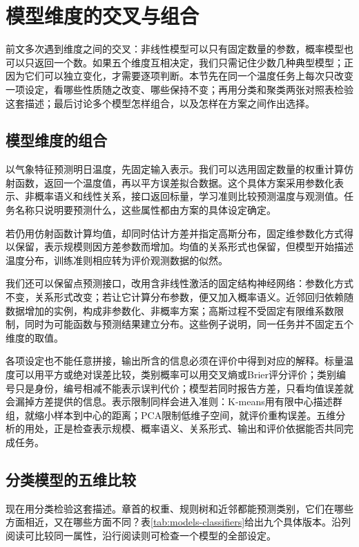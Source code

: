 \FloatBarrier
\section{模型维度的交叉与组合}
\label{sec:models-crossing}

前文多次遇到维度之间的交叉：非线性模型可以只有固定数量的参数，概率模型也可以只返回一个数。如果五个维度互相决定，我们只需记住少数几种典型模型；正因为它们可以独立变化，才需要逐项判断。本节先在同一个温度任务上每次只改变一项设定，看哪些性质随之改变、哪些保持不变；再用分类和聚类两张对照表检验这套描述；最后讨论多个模型怎样组合，以及怎样在方案之间作出选择。

\subsection{模型维度的组合}
\label{sec:models-dimension-combination}

以气象特征预测明日温度，先固定输入表示。我们可以选用固定数量的权重计算仿射函数，返回一个温度值，再以平方误差拟合数据。这个具体方案采用参数化表示、非概率语义和线性关系，接口返回标量，学习准则比较预测温度与观测值。任务名称只说明要预测什么，这些属性都由方案的具体设定确定。

若仍用仿射函数计算均值，却同时估计方差并指定高斯分布，固定维参数化方式得以保留，表示规模则因方差参数而增加。均值的关系形式也保留，但模型开始描述温度分布，训练准则相应转为评价观测数据的似然。

我们还可以保留点预测接口，改用含非线性激活的固定结构神经网络：参数化方式不变，关系形式改变；若让它计算分布参数，便又加入概率语义。近邻回归依赖随数据增加的实例，构成非参数化、非概率方案；高斯过程不受固定有限维系数限制，同时为可能函数与预测结果建立分布。这些例子说明，同一任务并不固定五个维度的取值。

各项设定也不能任意拼接，输出所含的信息必须在评价中得到对应的解释。标量温度可以用平方或绝对误差比较，类别概率可以用交叉熵或Brier评分评价；类别编号只是身份，编号相减不能表示误判代价；模型若同时报告方差，只看均值误差就会漏掉方差提供的信息。表示限制同样会进入准则：K-means用有限中心描述群组，就缩小样本到中心的距离；PCA限制低维子空间，就评价重构误差。五维分析的用处，正是检查表示规模、概率语义、关系形式、输出和评价依据能否共同完成任务。

\subsection{分类模型的五维比较}
\label{sec:models-classification-grid}

现在用分类检验这套描述。章首的权重、规则树和近邻都能预测类别，它们在哪些方面相近，又在哪些方面不同？表\ref{tab:models-classifiers}给出九个具体版本。沿列阅读可比较同一属性，沿行阅读则可检查一个模型的全部设定。

